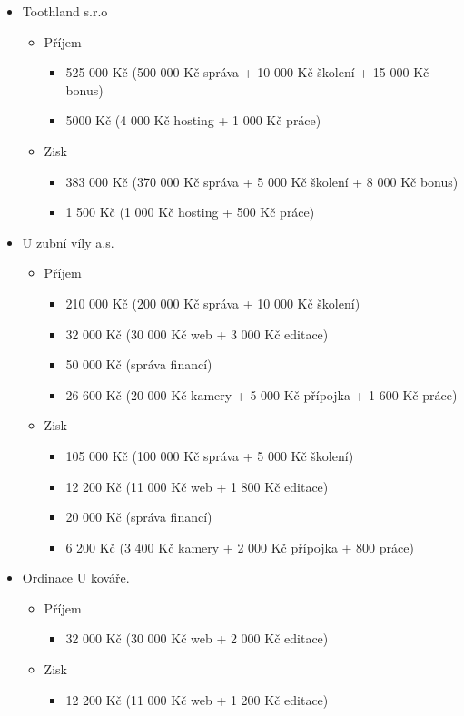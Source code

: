 \documentclass[11pt, a4paper, titlepage]{article}
\begin{document}
	\begin{itemize}
		\item Toothland s.r.o 
		\begin{itemize}
			\item Příjem
			\begin{itemize}
				\item 525 000 Kč (500 000 Kč správa + 10 000 Kč školení + 15 000 Kč bonus)
				\item 5000 Kč (4 000 Kč hosting + 1 000 Kč práce)
			\end{itemize}
			\item Zisk
			\begin{itemize}
				\item 383 000 Kč (370 000 Kč správa + 5 000 Kč školení + 8 000 Kč bonus)
				\item 1 500 Kč (1 000 Kč hosting + 500 Kč práce)
			\end{itemize}
		\end{itemize}
		\item U zubní víly a.s.
		\begin{itemize}
			\item Příjem
			\begin{itemize}
				\item 210 000 Kč (200 000 Kč správa + 10 000 Kč školení)
				\item 32 000 Kč (30 000 Kč web + 3 000 Kč editace)
				\item 50 000 Kč (správa financí)
				\item 26 600 Kč (20 000 Kč kamery + 5 000 Kč přípojka + 1 600 Kč práce)
			\end{itemize}
			\item Zisk
			\begin{itemize}
				\item 105 000 Kč (100 000 Kč správa + 5 000 Kč školení)
				\item 12 200 Kč (11 000 Kč web + 1 800 Kč editace)
				\item 20 000 Kč (správa financí)
				\item 6 200 Kč (3 400 Kč kamery + 2 000 Kč přípojka + 800 práce)
			\end{itemize}
		\end{itemize}
		\item Ordinace U kováře.
		\begin{itemize}
			\item Příjem
			\begin{itemize}
				\item 32 000 Kč (30 000 Kč web + 2 000 Kč editace)
			\end{itemize}
			\item Zisk
			\begin{itemize}
				\item 12 200 Kč (11 000 Kč web + 1 200 Kč editace)
			\end{itemize}
		\end{itemize}
	\end{itemize}
\end{document}
